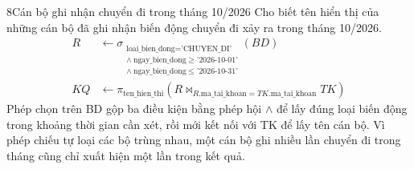 \begin{racau}{8}{Cán bộ ghi nhận chuyển đi trong tháng 10/2026}
Cho biết tên hiển thị của những cán bộ đã ghi nhận biến động chuyển đi xảy ra trong tháng 10/2026.
\begin{equation*}
\begin{aligned}
R &\leftarrow \sigma_{\substack{\text{loai\_bien\_dong} = \text{'CHUYEN\_DI'}\\ \wedge\ \text{ngay\_bien\_dong} \ge \text{'2026-10-01'}\\ \wedge\ \text{ngay\_bien\_dong} \le \text{'2026-10-31'}}}(BD)\\
KQ &\leftarrow \pi_{\text{ten\_hien\_thi}}\left(R \bowtie_{R.\text{ma\_tai\_khoan} = TK.\text{ma\_tai\_khoan}} TK\right)
\end{aligned}
\end{equation*}
Phép chọn trên BD gộp ba điều kiện bằng phép hội $\wedge$ để lấy đúng loại biến động trong khoảng thời gian cần xét, rồi mới kết nối với TK để lấy tên cán bộ. Vì phép chiếu tự loại các bộ trùng nhau, một cán bộ ghi nhiều lần chuyển đi trong tháng cũng chỉ xuất hiện một lần trong kết quả.
\end{racau}

